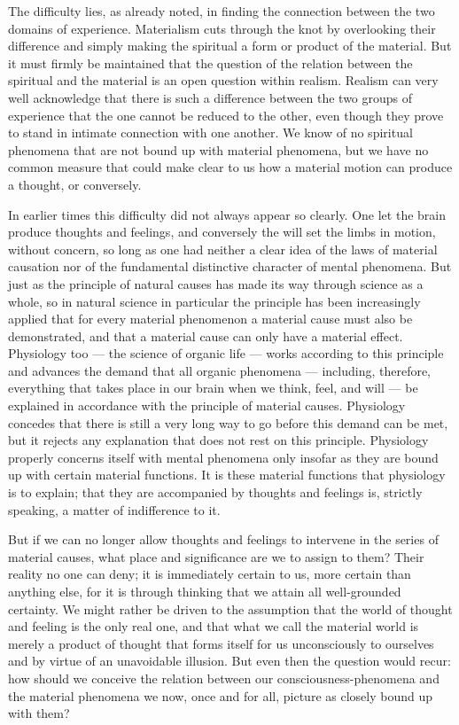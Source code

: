 \documentclass[12pt,a4paper,openany]{book}
\newcommand{\opage}[1]{\marginnote{\footnotesize\textit{[#1]}}}
\begin{document}
The difficulty lies, as already noted, in finding the connection between the two domains of experience. Materialism cuts through the knot by overlooking their difference and simply making the spiritual a form or product of the material. But it must firmly be maintained that
\opage{8}the question of the relation between the spiritual and the material is an open question within realism. Realism can very well acknowledge that there is such a difference between the two groups of experience that the one cannot be reduced to the other, even though they prove to stand in intimate connection with one another. We know of no spiritual phenomena that are not bound up with material phenomena, but we have no common measure that could make clear to us how a material motion can produce a thought, or conversely.

In earlier times this difficulty did not always appear so clearly. One let the brain produce thoughts and feelings, and conversely the will set the limbs in motion, without concern, so long as one had neither a clear idea of the laws of material causation nor of the fundamental distinctive character of mental phenomena. But just as the principle of natural causes has made its way through science as a whole, so in natural science in particular the principle has been increasingly applied that for every material phenomenon a material cause must also be demonstrated, and that a material cause can only have a material effect. Physiology too --- the science of organic life --- works according to this principle and advances the demand that all organic phenomena --- including, therefore, everything that takes place in our brain when we think, feel, and will --- be explained in accordance with the principle of material causes. Physiology concedes that there is still a very long way to go before this demand can be met, but it rejects any explanation that does not rest on this principle. Physiology properly concerns itself with mental phenomena only insofar as they are bound up with certain material functions. It is these material functions that physiology is to explain; that they are accompanied by thoughts and feelings is, strictly speaking, a matter of indifference to it.

But if we can no longer allow thoughts and feelings to intervene in the series of material causes, what place and significance are we to assign to them? Their reality no one can deny; it is immediately certain to us, more certain than
\opage{9}anything else, for it is through thinking that we attain all well-grounded certainty. We might rather be driven to the assumption that the world of thought and feeling is the only real one, and that what we call the material world is merely a product of thought that forms itself for us unconsciously to ourselves and by virtue of an unavoidable illusion. But even then the question would recur: how should we conceive the relation between our consciousness-phenomena and the material phenomena we now, once and for all, picture as closely bound up with them?
\end{document}
